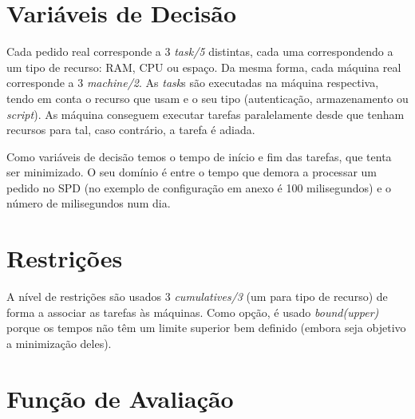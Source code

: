 \documentclass{llncs}
\begin{document}

\section{Variáveis de Decisão}\label{sec:Decision Variables}

Cada pedido real corresponde a 3 \textit{task/5} distintas, cada uma correspondendo a um tipo de recurso: RAM, CPU ou espaço. Da mesma forma, cada máquina real corresponde a 3 \textit{machine/2}. As \textit{task}s são executadas na máquina respectiva, tendo em conta o recurso que usam e o seu tipo (autenticação, armazenamento ou \textit{script}). As máquina conseguem executar tarefas paralelamente desde que tenham recursos para tal, caso contrário, a tarefa é adiada.


Como variáveis de decisão temos o tempo de início e fim das tarefas, que tenta ser minimizado. O seu domínio é entre o tempo que demora a processar um pedido no SPD (no exemplo de configuração em anexo é 100 milisegundos) e o número de milisegundos num dia.

\section{Restrições}\label{sec:Constraints}

A nível de restrições são usados 3 \textit{cumulatives/3} (um para tipo de recurso) de forma a associar as tarefas às máquinas. Como opção, é usado \textit{bound(upper)} porque os tempos não têm um limite superior bem definido (embora seja objetivo a minimização deles).

\section{Função de Avaliação}\label{sec:Evaluation Function}
\end{document}
